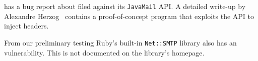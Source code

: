 

 has a bug report about \ehi filed against its \texttt{JavaMail} API. A detailed write-up by Alexandre Herzog~\cite{Herzog.2014} contains a proof-of-concept program that exploits the API to inject headers.

\begin{sloppypar}
From our preliminary testing Ruby's built-in \texttt{Net::SMTP} library also has an \ehi vulnerability. This is not documented on the library's homepage.
\end{sloppypar}
%


